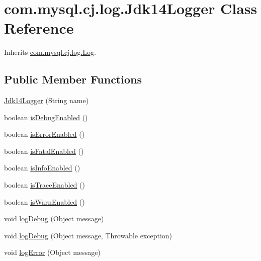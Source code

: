 \hypertarget{classcom_1_1mysql_1_1cj_1_1log_1_1_jdk14_logger}{}\section{com.\+mysql.\+cj.\+log.\+Jdk14\+Logger Class Reference}
\label{classcom_1_1mysql_1_1cj_1_1log_1_1_jdk14_logger}


Inherits \mbox{\hyperlink{interfacecom_1_1mysql_1_1cj_1_1log_1_1_log}{com.\+mysql.\+cj.\+log.\+Log}}.

\subsection*{Public Member Functions}
\begin{DoxyCompactItemize}
\item 
\mbox{\hyperlink{classcom_1_1mysql_1_1cj_1_1log_1_1_jdk14_logger_afec993e003924019014c8ac32bf1ffa9}{Jdk14\+Logger}} (String name)
\item 
boolean \mbox{\hyperlink{classcom_1_1mysql_1_1cj_1_1log_1_1_jdk14_logger_a91af3e97f6fbf354b88532b8aaa50453}{is\+Debug\+Enabled}} ()
\item 
boolean \mbox{\hyperlink{classcom_1_1mysql_1_1cj_1_1log_1_1_jdk14_logger_ae42f076b115e190b2c7bb186493ea171}{is\+Error\+Enabled}} ()
\item 
boolean \mbox{\hyperlink{classcom_1_1mysql_1_1cj_1_1log_1_1_jdk14_logger_af740a8480a6f4332aca8118b1143f311}{is\+Fatal\+Enabled}} ()
\item 
boolean \mbox{\hyperlink{classcom_1_1mysql_1_1cj_1_1log_1_1_jdk14_logger_ac01fd7e8de57ff3e72b588c86dcf7e32}{is\+Info\+Enabled}} ()
\item 
boolean \mbox{\hyperlink{classcom_1_1mysql_1_1cj_1_1log_1_1_jdk14_logger_abc67efb3ab231c21151dba192b032919}{is\+Trace\+Enabled}} ()
\item 
boolean \mbox{\hyperlink{classcom_1_1mysql_1_1cj_1_1log_1_1_jdk14_logger_a878077a85d6821f2b7ba2eca93e9e01d}{is\+Warn\+Enabled}} ()
\item 
void \mbox{\hyperlink{classcom_1_1mysql_1_1cj_1_1log_1_1_jdk14_logger_a9675c51be991227aaa6d395fb618eef2}{log\+Debug}} (Object message)
\item 
void \mbox{\hyperlink{classcom_1_1mysql_1_1cj_1_1log_1_1_jdk14_logger_a3be3b804fac31009afe4dcbc9a399027}{log\+Debug}} (Object message, Throwable exception)
\item 
void \mbox{\hyperlink{classcom_1_1mysql_1_1cj_1_1log_1_1_jdk14_logger_ab800a4f68be1be1e0e90581ea6239506}{log\+Error}} (Object message)

\end{DoxyCompactItemize}
